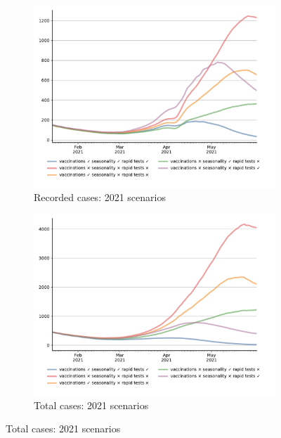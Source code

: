 \begin{figure}[!tp]
    \begin{subfigure}[b]{0.475\textwidth}
        \centering
        \includegraphics[width=\textwidth]{../figures/results/figures/scenario_comparisons/effect_of_channels_on_pessimistic_scenario/full_new_known_case}
        \caption{{\small Recorded cases: 2021 scenarios}}
        \label{fig:2021_scenarios_recorded}
    \end{subfigure}
    \hfill
    \begin{subfigure}[b]{0.475\textwidth}
        \centering
        \includegraphics[width=\textwidth]{../figures/results/figures/scenario_comparisons/effect_of_channels_on_pessimistic_scenario/full_newly_infected}
        \caption{{\small Total cases: 2021 scenarios}}
        \label{fig:2021_scenarios_newly_infected}
    \end{subfigure}


\end{figure}
